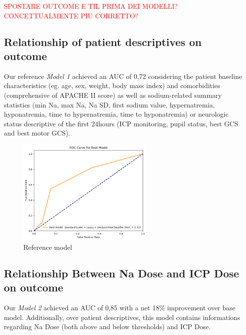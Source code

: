 \textcolor{red}{SPOSTARE OUTCOME E TIL PRIMA DEI MODELLI? CONCETTUALMENTE PIU CORRETTO?}


\subsection{Relationship of patient descriptives on outcome}
Our reference \textit{Model 1} achieved an AUC of 0,72 considering the patient baseline characteristics (eg. age, sex, weight, body mass index) and comorbidities (comprehensive of APACHE II score) as well as sodium-related summary statistics (min Na, max Na, Na SD, first sodium value, hypernatremia, hyponatremia, time to hypernatremia, time to hyponatremia) or neurologic status descriptive of the first 24hours (ICP monitoring, pupil status, best GCS and best motor GCS).
\begin{figure}[h]
    \centering
    \includegraphics[width=0.6\textwidth]{pictures/fig5_basemodel.png}
    \caption{Reference model} %
    \label{fig:model1} %
\end{figure}

\subsection{Relationship Between Na Dose and ICP Dose on outcome}
Our \textit{Model 2} achieved an AUC of 0,85 with a net 18\% improvement over base model. Additionally, over patient descriptives, this model contains informations regarding Na Dose (both above and below thresholds) and ICP Dose.

